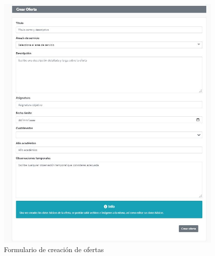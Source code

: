 \documentclass[11pt]{article}
\begin{document}
\begin{figure}
	\centering
	\includegraphics[scale=0.9]{oferta}
	\caption{Formulario de creación de ofertas}
\end{figure}
\end{document}
